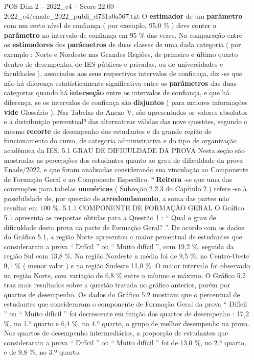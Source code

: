 \begin{textsample}{POS Dim 2 – 2022\_c4 – Score 22.00 – 2022\_c4/enade\_2022\_publi\_d731a0a567.txt}
O \textbf{estimador} de um \textbf{parâmetro} com um certo nível de confiança ( por exemplo, 95,0 \% ) deve conter o \textbf{parâmetro} no intervalo de confiança em 95 \% das vezes.
Na comparação entre os \textbf{estimadores} dos \textbf{parâmetros} de duas classes de uma dada categoria ( por exemplo : Norte e Nordeste nas Grandes Regiões, de primeiro e último quarto dentro de desempenho, de IES públicas e privadas, ou de universidades e faculdades ), associados aos seus respectivos intervalos de confiança, diz -se que não há diferença estatisticamente significativa entre os \textbf{parâmetros} das duas categorias quando há \textbf{interseção} entre os intervalos de confiança, e que há diferença, se os intervalos de confiança são \textbf{disjuntos} ( para maiores informações \textbf{vide} Glossário ).
Nas Tabelas do Anexo V, são apresentados os valores absolutos e a distribuição percentual⁹ das alternativas válidas das nove questões, segundo o mesmo \textbf{recorte} de desempenho dos estudantes e da grande região de funcionamento do curso, de categoria administrativa e do tipo de organização acadêmica da IES. 5.1 GRAU DE DIFICULDADE DA PROVA Nesta seção são mostradas as percepções dos estudantes quanto ao grau de dificuldade da prova Enade/2022, e que foram analisadas considerando sua vinculação ao Componente de Formação Geral e ao Componente Específico. ⁹ \textbf{Reitera} -se que uma das convenções para tabelas \textbf{numéricas} ( Subseção 2.2.3 do Capítulo 2 ) refere -se à possibilidade de, por questão de \textbf{arredondamento}, a soma das partes não resultar em 100 \%. 5.1.1 COMPONENTE DE FORMAÇÃO GERAL O Gráfico 5.1 apresenta as respostas obtidas para a Questão 1 : “ Qual o grau de dificuldade desta prova na parte de Formação Geral? ”.
De acordo com os dados do Gráfico 5.1, a região Norte apresentou o maior percentual de estudantes que consideraram a prova “ Difícil ” ou “ Muito difícil ”, com 19,2 \%, seguida da região Sul com 13,8 \%.
Na região Nordeste a média foi de 9,5 \%, no Centro-Oeste 9,1 \% ( menor valor ) e na região Sudeste 11,0 \%.
O maior intervalo foi observado na região Norte, com variação de 6,8 \% entre o mínimo e máximo.
O Gráfico 5.2 traz mais resultados sobre a questão tratada no gráfico anterior, porém por quartos de desempenho.
Os dados do Gráfico 5.2 mostram que o percentual de estudantes que consideraram o componente de Formação Geral da prova “ Difícil ” ou “ Muito difícil ” foi decrescente em função dos quartos de desempenho : 17,2 \%, no 1.º quarto e 6,4 \%, no 4.º quarto, o grupo de melhor desempenho na prova.
Nos quartos de desempenho intermediários, a proporção de estudantes que consideraram a prova “ Difícil ” ou “ Muito difícil ” foi de 13,0 \%, no 2.º quarto, e de 9,8 \%, no 3.º quarto.

\end{textsample}
